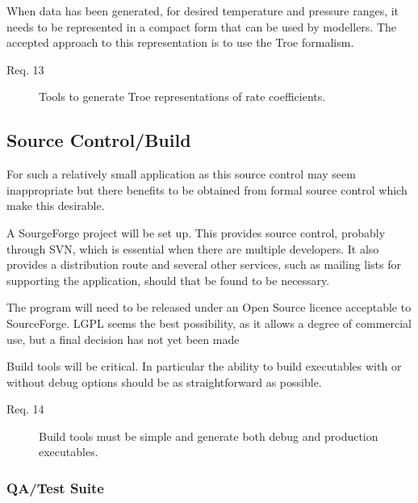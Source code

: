 When data has been generated, for desired temperature and pressure ranges, it needs to be represented in a compact form that can be used by modellers. The accepted approach to this representation is to use the Troe formalism.


\begin{description}
\item[Req. 13]{Tools to generate Troe representations of rate coefficients.}
\end{description}

\subsection{Source Control/Build
}\label{sec:SourceControlBuild
}

For such a relatively small application as this source control may seem inappropriate but there benefits to be obtained from formal source control which make this desirable.

A SourgeForge project will be set up. This provides source control, probably through SVN, which is essential when there are multiple developers. It also provides a distribution route and several other services, such as mailing lists for supporting the application, should that be found to be necessary.

The program will need to be released under an Open Source licence acceptable to SourceForge. LGPL seems the best possibility, as it allows a degree of commercial use, but a final decision has not yet been made 

Build tools will be critical. In particular the ability to build executables with or without debug options should be as straightforward as possible.


\begin{description}
\item[Req. 14]{Build tools must be simple and generate both debug and production executables.}
\end{description}

\subsubsection{QA/Test Suite}\label{sec:QA_TestSuite}


